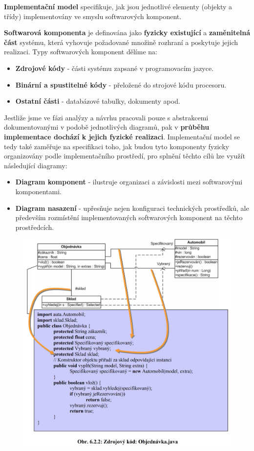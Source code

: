 \textbf{Implementační model }specifikuje, jak jsou jednotlivé elementy (objekty a třídy) implementovány ve smyslu softwarových komponent.

\textbf{Softwarová komponenta} je definována jako \textbf{fyzicky existující} a \textbf{zaměnitelná část} systému, která vyhovuje požadované množině rozhraní a poskytuje jejich realizaci. Typy softwarových komponent dělíme na:

\begin{itemize}
\item \textbf{Zdrojové kódy} - části systému zapsané v programovacím jazyce.
\item \textbf{Binární a spustitelné kódy} - přeložené do strojové kódu procesoru.
\item \textbf{Ostatní části} - databázové tabulky, dokumenty apod.
\end{itemize}

Jestliže jsme ve fázi analýzy a návrhu pracovali pouze s abstrakcemi dokumentovanými v podobě jednotlivých {diagramů}, pak v \textbf{průběhu implementace dochází k jejich fyzické realizaci}. Implementační model se tedy také zaměřuje na specifikaci toho, jak budou tyto {komponenty fyzicky organizovány podle implementačního prostředí}, pro splnění těchto cílů lze využít následující diagramy:
\begin{itemize}
\item \textbf{Diagram komponent} - ilustruje organizaci a závislosti mezi softwarovými komponentami.
\item \textbf{Diagram nasazení} - upřesňuje nejen konfiguraci technických prostředků, ale především rozmístění implementovaných softwarových komponent na těchto prostředcích.
\end{itemize}

\begin{figure}[H]
	\centering
	\includegraphics[width=.8\textwidth]{assets/mapovani_uml.jpg}
\end{figure}

